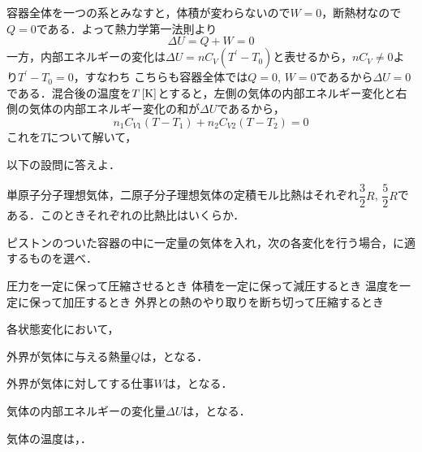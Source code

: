 \begin{reidaiunit}
\begin{kaitou}
\begin{komon}
 容器全体を一つの系とみなすと，体積が変わらないので$W=0$，断熱材なので$Q=0$である．よって熱力学第一法則より
       \[\Delta U=Q+W=0\]
       一方，内部エネルギーの変化は$\Delta U=nC_V(T^\prime-T_0)$と表せるから，$nC_V\neq 0$より$T^\prime-T_0=0$，すなわち
 こちらも容器全体では$Q=0$, $W=0$であるから$\Delta U=0$である．混合後の温度を$T\,[\mathrm{K}]$とすると，左側の気体の内部エネルギー変化と右側の気体の内部エネルギー変化の和が$\Delta U$であるから，
       \[n_1C_{V1}(T-T_1)+n_2C_{V2}(T-T_2)=0\]
       これを$T$について解いて，
\end{komon}
\end{kaitou}
\end{reidaiunit}



\newpage

\setcounter{qno}{23}

\filbreak
{}


\hspace{1zw}以下の設問に答えよ．

\hspace{1zw}単原子分子理想気体，二原子分子理想気体の定積モル比熱はそれぞれ$\dfrac{3}{2}R$, $\dfrac{5}{2}R$である．このときそれぞれの比熱比はいくらか．

\filbreak
{}


\hspace{1zw}ピストンのついた容器の中に一定量の気体を入れ，次の各変化を行う場合，に適するものを選べ．
\begin{komon}
 圧力を一定に保って圧縮させるとき
 体積を一定に保って減圧するとき
 温度を一定に保って加圧するとき
 外界との熱のやり取りを断ち切って圧縮するとき
\end{komon}
\hspace{1zw}各状態変化において，
\begin{list}{}{\setlength{\leftmargin}{2zw}\setlength{\itemsep}{0.4mm}\setlength{\topsep}{0.6mm}\setlength{\parsep}{0pt}}
\item[・] 外界が気体に与える熱量$Q$は，となる．
\item[・] 外界が気体に対してする仕事$W$は，となる．
\item[・] 気体の内部エネルギーの変化量$\Delta U$は，となる．
\item[・] 気体の温度は，．
\end{list}

